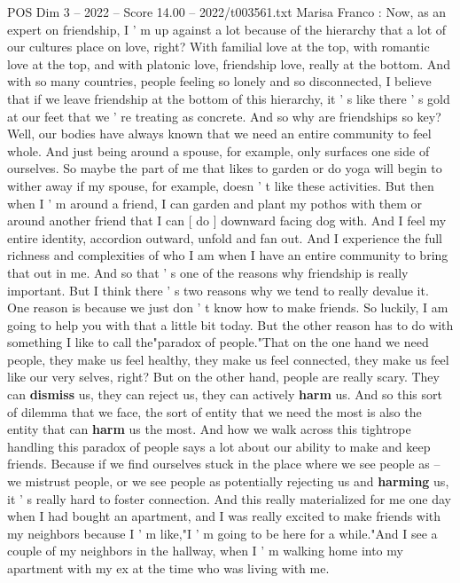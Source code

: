 \begin{textsample}{POS Dim 3 – 2022 – Score 14.00 – 2022/t003561.txt}  \label{ex:f3_pos_022}
Marisa Franco : Now, as an expert on friendship, I ' m up against a lot because of the hierarchy that a lot of our cultures place on love, right?
With familial love at the top, with romantic love at the top, and with platonic love, friendship love, really at the bottom.
And with so many countries, people feeling so lonely and so disconnected, I believe that if we leave friendship at the bottom of this hierarchy, it ' s like there ' s gold at our feet that we ' re treating as concrete.
And so why are friendships so key?
Well, our bodies have always known that we need an entire community to feel whole.
And just being around a spouse, for example, only surfaces one side of ourselves.
So maybe the part of me that likes to garden or do yoga will begin to wither away if my spouse, for example, doesn ' t like these activities.
But then when I ' m around a friend, I can garden and plant my pothos with them or around another friend that I can [ do ] downward facing dog with.
And I feel my entire identity, accordion outward, unfold and fan out.
And I experience the full richness and complexities of who I am when I have an entire community to bring that out in me.
And so that ' s one of the reasons why friendship is really important.
But I think there ' s two reasons why we tend to really devalue it.
One reason is because we just don ' t know how to make friends.
So luckily, I am going to help you with that a little bit today.
But the other reason has to do with something I like to call the"paradox of people."That on the one hand we need people, they make us feel healthy, they make us feel connected, they make us feel like our very selves, right?
But on the other hand, people are really scary.
They can \textbf{dismiss} us, they can reject us, they can actively \textbf{harm} us.
And so this sort of dilemma that we face, the sort of entity that we need the most is also the entity that can \textbf{harm} us the most.
And how we walk across this tightrope handling this paradox of people says a lot about our ability to make and keep friends.
Because if we find ourselves stuck in the place where we see people as -- we mistrust people, or we see people as potentially rejecting us and \textbf{harming} us, it ' s really hard to foster connection.
And this really materialized for me one day when I had bought an apartment, and I was really excited to make friends with my neighbors because I ' m like,"I ' m going to be here for a while."And I see a couple of my neighbors in the hallway, when I ' m walking home into my apartment with my ex at the time who was living with me.

\end{textsample}
